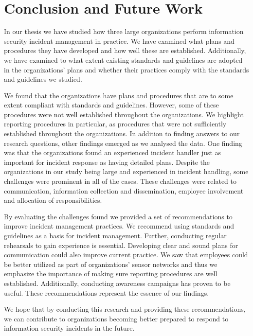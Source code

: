\chapter{Conclusion and Future Work}
\label{chp:conclusion}
In our thesis we have studied how three large organizations perform information security incident management in practice. We have examined what plans and procedures they have developed and how well these are established. Additionally, we have examined to what extent existing standards and guidelines are adopted in the organizations' plans and whether their practices comply with the standards and guidelines we studied.

We found that the organizations have plans and procedures that are to some extent compliant with standards and guidelines. However, some of these procedures were not well established throughout the organizations. We highlight reporting procedures in particular, as procedures that were not sufficiently established throughout the organizations. In addition to finding answers to our research questions, other findings emerged as we analysed the data. One finding was that the organizations found an experienced incident handler just as important for incident response as having detailed plans. Despite the organizations in our study being large and experienced in incident handling, some challenges were prominent in all of the cases. These challenges were related to communication, information collection and dissemination, employee involvement and allocation of responsibilities. 

By evaluating the challenges found we provided a set of recommendations to improve incident management practices. We recommend using standards and guidelines as a basis for incident management. Further, conducting regular rehearsals to gain experience is essential. Developing clear and sound plans for communication could also improve current practice. We saw that employees could be better utilized as part of organizations' sensor networks and thus we emphasize the importance of making sure reporting procedures are well established. Additionally, conducting awareness campaigns has proven to be useful. These recommendations represent the essence of our findings. 

We hope that by conducting this research and providing these recommendations, we can contribute to organizations becoming better prepared to respond to information security incidents in the future. 

